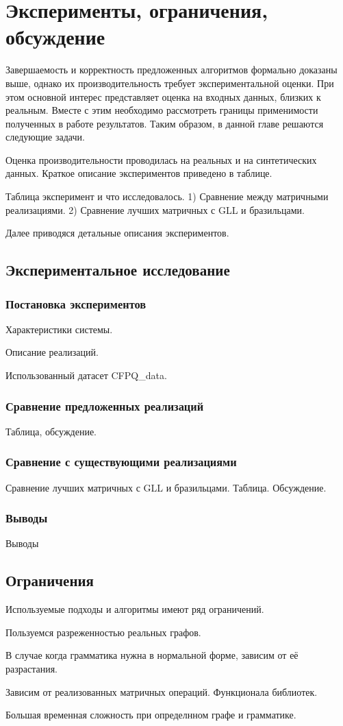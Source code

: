 \chapter{Эксперименты, ограничения, обсуждение}\label{ch:ch5}
Завершаемость и корректность предложенных алгоритмов формально доказаны выше, однако их производительность требует экспериментальной оценки. При этом основной интерес представляет оценка на входных данных, близких к реальным. Вместе с этим необходимо рассмотреть границы применимости полученных в работе результатов. Таким образом, в данной главе решаются следующие задачи.

Оценка производительности проводилась на реальных и на синтетических данных. Краткое описание экспериментов приведено в таблице.

Таблица эксперимент и что исследовалось.
1) Сравнение между матричными реализациями. 2) Сравнение лучших матричных с GLL и бразильцами.

Далее приводяся детальные описания экспериментов.

\section{Экспериментальное исследование}\label{sec:ch5/sect1}

\subsection{Постановка экспериментов}
Характеристики системы.

Описание реализаций.

Использованный датасет CFPQ\_data.

\subsection{Сравнение предложенных реализаций}
Таблица, обсуждение.

\subsection{Сравнение с существующими реализациями}
Сравнение лучших матричных с GLL и бразильцами. Таблица. Обсуждение.
 
\subsection{Выводы}
Выводы

\section{Ограничения}\label{sec:ch5/sect3}
Используемые подходы и алгоритмы имеют ряд ограничений.

Пользуемся разреженностью реальных графов.

В случае когда грамматика нужна в нормальной форме, зависим от её разрастания.

Зависим от реализованных матричных операций. Функционала библиотек.

Большая временная сложность при определнном графе и грамматике.

\clearpage